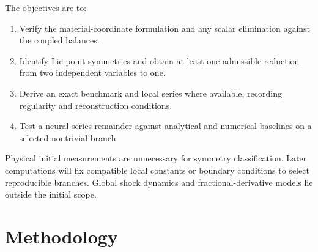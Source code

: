 \documentclass[12pt,a4paper]{article}
\begin{document}
The objectives are to:
\begin{enumerate}
\item Verify the material-coordinate formulation and any scalar elimination against the coupled balances.
\item Identify Lie point symmetries and obtain at least one admissible reduction from two independent variables to one.
\item Derive an exact benchmark and local series where available, recording regularity and reconstruction conditions.
\item Test a neural series remainder against analytical and numerical baselines on a selected nontrivial branch.
\end{enumerate}
Physical initial measurements are unnecessary for symmetry classification. Later computations will fix compatible local constants or boundary conditions to select reproducible branches. Global shock dynamics and fractional-derivative models lie outside the initial scope.

\section{Methodology}
\end{document}
